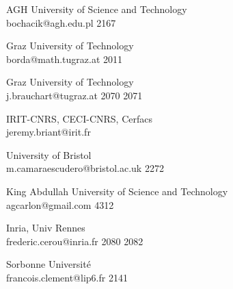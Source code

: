 \begin{multicols}{2}
 {AGH University of Science and Technology\\}%
 {bochacik@agh.edu.pl}%
 {2167} %
 {} %
 {} %
 {} %
 {} %


 {Graz University of Technology\\}%
 {borda@math.tugraz.at}%
 {2011} %
 {} %
 {} %
 {} %
 {} %


 {Graz University of Technology\\}%
 {j.brauchart@tugraz.at}%
 {2070} %
 {2071} %
 {} %
 {} %
 {} %


 {IRIT-CNRS, CECI-CNRS, Cerfacs\\}%
 {jeremy.briant@irit.fr}%
 {} %
 {} %
 {} %
 {} %
 {} %

 {University of Bristol\\}%
 {m.camaraescudero@bristol.ac.uk}%
 {2272} %
 {} %
 {} %
 {} %
 {} %

 {King Abdullah University of Science and Technology\\}%
 {agcarlon@gmail.com}%
 {4312} %
 {} %
 {} %
 {} %
 {} %

 {Inria, Univ Rennes\\}%
 {frederic.cerou@inria.fr}%
 {2080} %
 {2082} %
 {} %
 {} %
 {} %

 {Sorbonne Universit\'{e}\\}%
 {francois.clement@lip6.fr}%
 {2141} %
 {} %
 {} %
 {} %
 {} %


\end{multicols}
